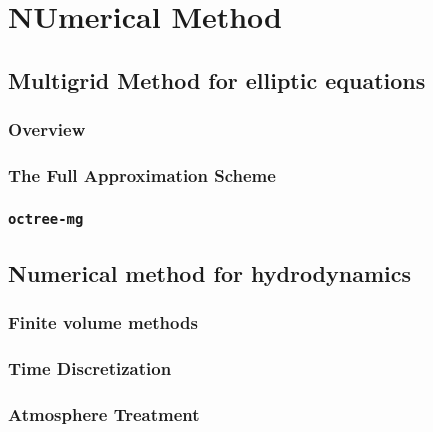 
\chapter{NUmerical Method}  %

\ifpdf
    \graphicspath{{Chapter4/Figs/Raster/}{Chapter4/Figs/PDF/}{Chapter4/Figs/}}
\else
    \graphicspath{{Chapter4/Figs/Vector/}{Chapter4/Figs/}}
\fi


\section{Multigrid Method for elliptic equations} %
\label{section4.1}

\subsection{Overview} %
\label{section4.1.1}

\subsection{The Full Approximation Scheme} %
\label{section4.1.2}

\subsection{\texttt{octree-mg}} %
\label{section4.1.3}

\section{Numerical method for hydrodynamics} %
\label{section4.2}

\subsection{Finite volume methods} %
\label{section4.2.1}

\subsection{Time Discretization} %
\label{section4.2.2}

\subsection{Atmosphere Treatment} %
\label{section4.2.3}

